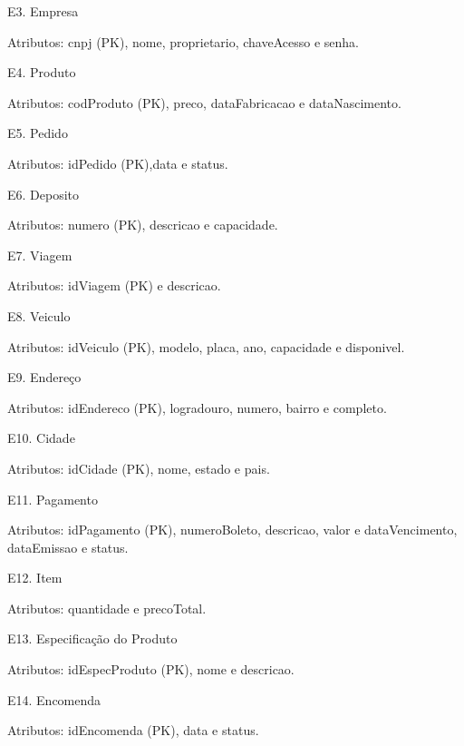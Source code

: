 \documentclass[12pt, onecolumn, titlepage]{article}
\begin{document}
\begin{description}
\item E3. Empresa
\item \qquad Atributos: cnpj (PK), nome, proprietario, chaveAcesso e senha.

\item E4. Produto
\item \qquad Atributos: codProduto (PK), preco, dataFabricacao e dataNascimento.

\item E5. Pedido
\item \qquad Atributos: idPedido (PK),data e status.

\item E6. Deposito
\item \qquad Atributos: numero (PK), descricao e capacidade.

\item E7. Viagem
\item \qquad Atributos: idViagem (PK) e descricao.

\item E8. Veiculo
\item \qquad Atributos: idVeiculo (PK), modelo, placa, ano, capacidade e disponivel.

\item E9. Endereço
\item \qquad Atributos: idEndereco (PK), logradouro, numero, bairro e completo.

\item E10. Cidade
\item \qquad Atributos: idCidade (PK), nome, estado e pais.

\item E11. Pagamento
\item \qquad Atributos: idPagamento (PK), numeroBoleto, descricao, valor e dataVencimento, dataEmissao e status.

\item E12. Item
\item \qquad Atributos: quantidade e precoTotal.

\item E13. Especificação do Produto
\item \qquad Atributos: idEspecProduto (PK), nome e descricao.

\item E14. Encomenda
\item \qquad Atributos: idEncomenda (PK), data e status.

\end{description}
\end{document}
